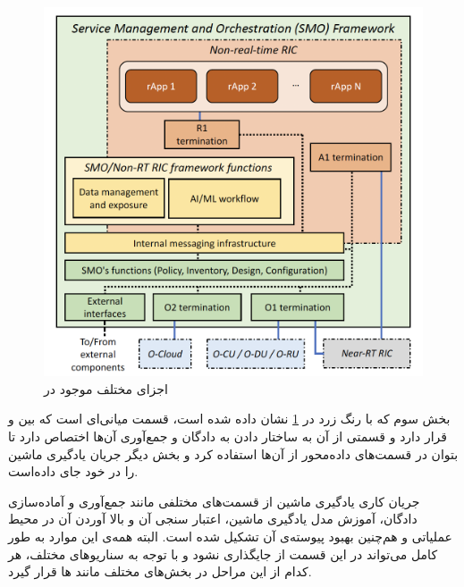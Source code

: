 \begin{figure}[H]
	\includegraphics[width=0.85\columnwidth]{Picture/nonert-ric2.png}
	\centering
	\caption{اجزای مختلف موجود در
		}
	\label{fig:nonert-ric2}
\end{figure}

بخش سوم که با رنگ زرد در 
\ref{fig:nonert-ric2}
نشان داده شده است، قسمت میانی‌ای است که بین
و
قرار دارد و قسمتی از آن به ساختار دادن به دادگان و جمع‌آوری آن‌ها اختصاص دارد تا بتوان در قسمت‌های داده‌محور از آن‌ها استفاده کرد و بخش دیگر جریان یادگیری ماشین را در خود جای داده‌است.

جریان کاری یادگیری ماشین از قسمت‌های مختلفی مانند جمع‌آوری و آماده‌سازی دادگان، آموزش مدل یادگیری ماشین، اعتبار سنجی آن و بالا آوردن آن در محیط عملیاتی و هم‌چنین بهبود پیوسته‌ی آن تشکیل شده است. البته همه‌ی این موارد به طور کامل می‌تواند در این قسمت از 
جایگذاری نشود و با توجه به سناریوهای مختلف، هر کدام از این مراحل در بخش‌های مختلف 
مانند 
ها
قرار گیرد.



